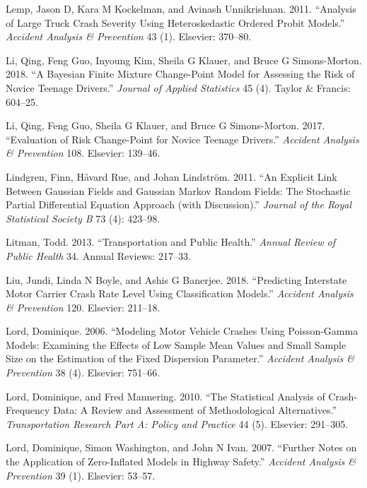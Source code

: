 \documentclass[12pt]{book}
\numberwithin{equation}{chapter}
\begin{document}
\leavevmode\hypertarget{ref-lemp2011analysis}{}%
Lemp, Jason D, Kara M Kockelman, and Avinash Unnikrishnan. 2011. ``Analysis of Large Truck Crash Severity Using Heteroskedastic Ordered Probit Models.'' \emph{Accident Analysis \& Prevention} 43 (1). Elsevier: 370--80.

\leavevmode\hypertarget{ref-li2018bayesian}{}%
Li, Qing, Feng Guo, Inyoung Kim, Sheila G Klauer, and Bruce G Simons-Morton. 2018. ``A Bayesian Finite Mixture Change-Point Model for Assessing the Risk of Novice Teenage Drivers.'' \emph{Journal of Applied Statistics} 45 (4). Taylor \& Francis: 604--25.

\leavevmode\hypertarget{ref-li2017evaluation}{}%
Li, Qing, Feng Guo, Sheila G Klauer, and Bruce G Simons-Morton. 2017. ``Evaluation of Risk Change-Point for Novice Teenage Drivers.'' \emph{Accident Analysis \& Prevention} 108. Elsevier: 139--46.

\leavevmode\hypertarget{ref-Lindgren2011}{}%
Lindgren, Finn, Håvard Rue, and Johan Lindström. 2011. ``An Explicit Link Between Gaussian Fields and Gaussian Markov Random Fields: The Stochastic Partial Differential Equation Approach (with Discussion).'' \emph{Journal of the Royal Statistical Society B} 73 (4): 423--98.

\leavevmode\hypertarget{ref-litman2013transportation}{}%
Litman, Todd. 2013. ``Transportation and Public Health.'' \emph{Annual Review of Public Health} 34. Annual Reviews: 217--33.

\leavevmode\hypertarget{ref-liu2018predicting}{}%
Liu, Jundi, Linda N Boyle, and Ashis G Banerjee. 2018. ``Predicting Interstate Motor Carrier Crash Rate Level Using Classification Models.'' \emph{Accident Analysis \& Prevention} 120. Elsevier: 211--18.

\leavevmode\hypertarget{ref-lord2006modeling}{}%
Lord, Dominique. 2006. ``Modeling Motor Vehicle Crashes Using Poisson-Gamma Models: Examining the Effects of Low Sample Mean Values and Small Sample Size on the Estimation of the Fixed Dispersion Parameter.'' \emph{Accident Analysis \& Prevention} 38 (4). Elsevier: 751--66.

\leavevmode\hypertarget{ref-lord2010statistical}{}%
Lord, Dominique, and Fred Mannering. 2010. ``The Statistical Analysis of Crash-Frequency Data: A Review and Assessment of Methodological Alternatives.'' \emph{Transportation Research Part A: Policy and Practice} 44 (5). Elsevier: 291--305.

\leavevmode\hypertarget{ref-lord2007further}{}%
Lord, Dominique, Simon Washington, and John N Ivan. 2007. ``Further Notes on the Application of Zero-Inflated Models in Highway Safety.'' \emph{Accident Analysis \& Prevention} 39 (1). Elsevier: 53--57.
\end{document}
